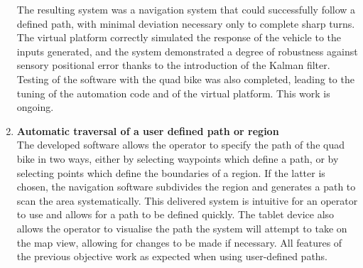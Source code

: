 \documentclass[main.tex]{subfiles}
\begin{document}
\begin{enumerate}
The resulting system was a navigation system that could successfully follow a defined path, with minimal deviation necessary only to complete sharp turns. The virtual platform correctly simulated the response of the vehicle to the inputs generated, and the system demonstrated a degree of robustness against sensory positional error thanks to the introduction of the Kalman filter. Testing of the software with the quad bike was also completed, leading to the tuning of the automation code and of the virtual platform. This work is ongoing.

\item \textbf{Automatic traversal of a user defined path or region}\\ 
The developed software allows the operator to specify the path of the quad bike in two ways, either by selecting waypoints which define a path, or by selecting points which define the boundaries of a region. If the latter is chosen, the navigation software subdivides the region and generates a path to scan the area systematically. 
This delivered system is intuitive for an operator to use and allows for a path to be defined quickly. The tablet device also allows the operator to visualise the path the system will attempt to take on the map view, allowing for changes to be made if necessary. All features of the previous objective work as expected when using user-defined paths. 


\end{enumerate}
\end{document}
